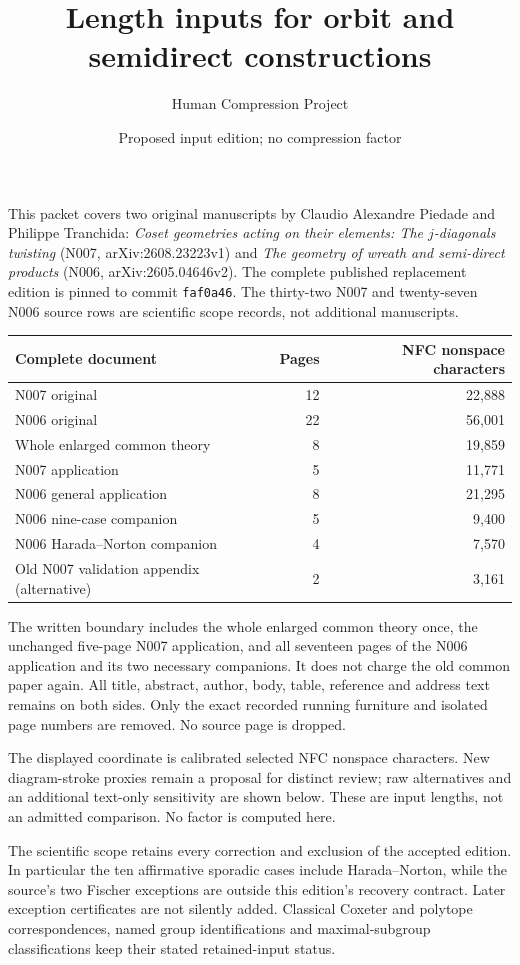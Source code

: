 \documentclass[11pt,a4paper]{article}
\title{Length inputs for orbit and semidirect constructions}\author{Human Compression Project}\date{Proposed input edition; no compression factor}
\begin{document}
\maketitle
This packet covers two original manuscripts by Claudio Alexandre Piedade and Philippe Tranchida: \emph{Coset geometries acting on their elements: The $j$-diagonals twisting} (N007, arXiv:2608.23223v1) and \emph{The geometry of wreath and semi-direct products} (N006, arXiv:2605.04646v2). The complete published replacement edition is pinned to commit \texttt{faf0a46}. The thirty-two N007 and twenty-seven N006 source rows are scientific scope records, not additional manuscripts.

\begin{center}\begin{tabular}{lrr}\toprule
Complete document & Pages & NFC nonspace characters\\\midrule
N007 original & 12 & 22,888\\
N006 original & 22 & 56,001\\
Whole enlarged common theory & 8 & 19,859\\
N007 application & 5 & 11,771\\
N006 general application & 8 & 21,295\\
N006 nine-case companion & 5 & 9,400\\
N006 Harada--Norton companion & 4 & 7,570\\
Old N007 validation appendix (alternative) & 2 & 3,161\\
\bottomrule\end{tabular}\end{center}
The written boundary includes the whole enlarged common theory once, the unchanged five-page N007 application, and all seventeen pages of the N006 application and its two necessary companions. It does not charge the old common paper again. All title, abstract, author, body, table, reference and address text remains on both sides. Only the exact recorded running furniture and isolated page numbers are removed. No source page is dropped.

The displayed coordinate is calibrated selected NFC nonspace characters. New diagram-stroke proxies remain a proposal for distinct review; raw alternatives and an additional text-only sensitivity are shown below. These are input lengths, not an admitted comparison. No factor is computed here.

The scientific scope retains every correction and exclusion of the accepted edition. In particular the ten affirmative sporadic cases include Harada--Norton, while the source's two Fischer exceptions are outside this edition's recovery contract. Later exception certificates are not silently added. Classical Coxeter and polytope correspondences, named group identifications and maximal-subgroup classifications keep their stated retained-input status.
\newpage
\end{document}
